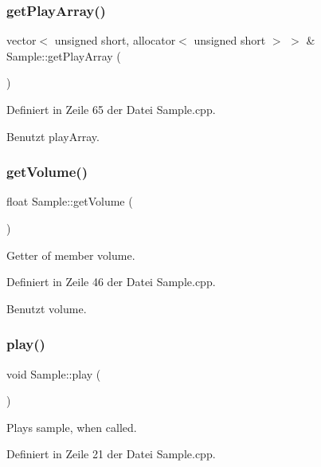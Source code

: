 \subsubsection{\texorpdfstring{get\+Play\+Array()}{getPlayArray()}}
{\footnotesize\ttfamily vector$<$ unsigned short, allocator$<$ unsigned short $>$ $>$ \& Sample\+::get\+Play\+Array (\begin{DoxyParamCaption}{ }\end{DoxyParamCaption})}



Definiert in Zeile 65 der Datei Sample.\+cpp.



Benutzt play\+Array.

\mbox{\label{class_sample_a9f3c251183832a53ec1967331d022575}} 
\subsubsection{\texorpdfstring{get\+Volume()}{getVolume()}}
{\footnotesize\ttfamily float Sample\+::get\+Volume (\begin{DoxyParamCaption}{ }\end{DoxyParamCaption})}



Getter of member volume. 



Definiert in Zeile 46 der Datei Sample.\+cpp.



Benutzt volume.

\mbox{\label{class_sample_a2ccc1c5571e54ba6725714cd795698f3}} 
\subsubsection{\texorpdfstring{play()}{play()}}
{\footnotesize\ttfamily void Sample\+::play (\begin{DoxyParamCaption}{ }\end{DoxyParamCaption})}



Plays sample, when called. 



Definiert in Zeile 21 der Datei Sample.\+cpp.



